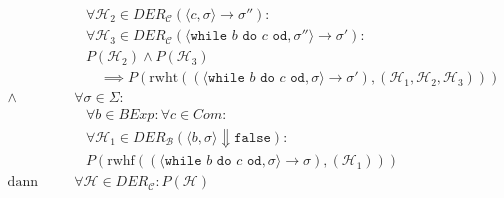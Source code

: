 \begin{align*}
																		                  & \quad \forall \mathcal{H} _ 2 \in \textit{DER} _ \mathcal{C} (\langle c, \sigma \rangle \rightarrow \sigma'') :                                                                                                            \\
																		                  & \quad \forall \mathcal{H} _ 3 \in \textit{DER} _ \mathcal{C} (\langle \texttt{while } b \texttt{ do } c \texttt{ od}, \sigma'' \rangle \rightarrow \sigma') :                                                              \\
																		                  & \quad P(\mathcal{H} _ 2) \land P(\mathcal{H} _ 3)                                                                                                                                                                          \\
																		                  & \quad\quad \implies P(\text{rwht}((\langle \texttt{while } b \texttt{ do } c \texttt{ od}, \sigma \rangle \rightarrow \sigma'), (\mathcal{H} _ 1, \mathcal{H} _ 2, \mathcal{H} _ 3)))                                      \\
																		\land             & \,\forall \sigma \in \Sigma :                                                                                                                                                                                              \\
																		                  & \quad \forall b \in \textit{BExp} : \forall c \in \textit{Com} :                                                                                                                                                           \\
																		                  & \quad \forall \mathcal{H} _ 1 \in \textit{DER} _ \mathcal{B} (\langle b, \sigma \rangle \Downarrow \texttt{false}) :                                                                                                       \\
																		                  & \quad P(\text{rwhf}((\langle \texttt{while } b \texttt{ do } c \texttt{ od}, \sigma \rangle \rightarrow \sigma), (\mathcal{H} _ 1)))                                                                                       \\
																		\text{dann gilt:} & \,\forall \mathcal{H} \in \textit{DER} _ \mathcal{C} : P(\mathcal{H})                                                                                                                                                      \\
																	\end{align*}

